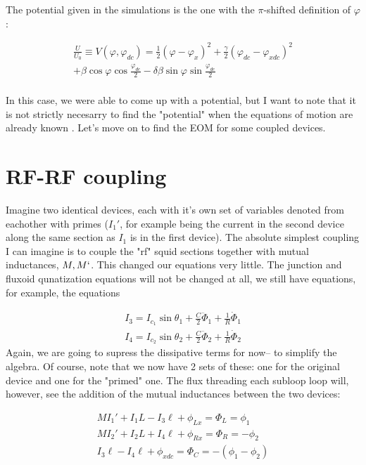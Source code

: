 \documentclass[paper=a4, twocolumn, fontsize=10pt]{article} %
\numberwithin{equation}{section} %
\numberwithin{figure}{section} %
\numberwithin{table}{section} %
\begin{document}
The potential given in the simulations is the one with the $\pi$-shifted definition of $\varphi$:

\begin{align}
    \frac{U}{U_0} \equiv V(\varphi, \varphi_{dc}) =  \frac{1}{2} (\varphi-\varphi_x)^2 + \frac{\gamma}{2} (\varphi_{dc}-\varphi_{xdc})^2
    \\
     + \beta \cos \varphi \cos \frac{\varphi_{dc}}{2} - \delta\beta \sin \varphi \sin \frac{\varphi_{dc}}{2}
    \\
\end{align}



 In this case, we were able to come up with a potential, but I want to note that it is not strictly necesarry to find the "potential" when the equations of motion are already known . Let's move on to find the EOM for some coupled devices.


\section{ RF-RF coupling}

Imagine two identical devices, each with it's own set of variables denoted from eachother with primes ($I_1'$, for example being the current in the second device along the same section as $I_1$ is in the first device). The absolute simplest coupling I can imagine is to couple the "rf" squid sections together with mutual inductances, $M, M`$. This changed our equations very little. The junction and fluxoid qunatization equations will not be changed at all, we still have equations, for example, the equations

\begin{align}
    I_3 = I_{c_1} \sin \theta_1 + \frac{C}{2} \ddot{\Phi}_1 + \frac{1}{R} \dot{\Phi}_1
    \\ 
    I_4 = I_{c_2} \sin \theta_2 + \frac{C}{2} \ddot{\Phi}_2 + \frac{1}{R} \dot{\Phi}_2
    \end{align} 
Again, we are going to supress the dissipative terms for now-- to simplify the algebra. Of course, note that we now have 2 sets of these: one for the original device and one for the "primed" one.  The flux threading each subloop loop will, however, see the addition of the mutual inductances between the two devices:

\begin{align}
    MI_1' + I_1 L - I_3 \ell + \phi_{Lx} = \Phi_{L} = \phi_1
    \\
    MI_2' + I_2 L + I_4 \ell + \phi_{Rx} = \Phi_{R} = -\phi_2
    \\
    I_3 \ell - I_4 \ell + \phi_{xdc} = \Phi_{C} = -(\phi_1 - \phi_2)
\end{align} 
\end{document}
